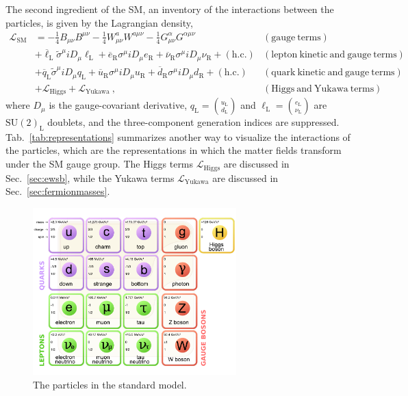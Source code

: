 The second ingredient of the SM, an inventory of the interactions between the
particles, is given by the Lagrangian density, 
\begin{align}
\mathcal{L}_{\mathrm{SM}} &= -\frac{1}{4}B_{\mu\nu}B^{\mu\nu} -\frac{1}{4}W^{a}_{\mu\nu}W^{a\mu\nu} - \frac{1}{4}G^{\alpha}_{\mu\nu}G^{\alpha\mu\nu}
  & \mathrm{(gauge~terms)}\nonumber\\
& +\overline\ell_\mathrm{L}\tilde\sigma^{\mu}iD_{\mu}\ell_\mathrm{L} +
   \overline e_\mathrm{R}\sigma^{\mu}iD_{\mu}e_\mathrm{R} + \overline \nu_\mathrm{R}
   \sigma^{\mu}iD_{\mu}\nu_\mathrm{R} + (\mathrm{h.c.})& \mathrm{(lepton~kinetic~and~gauge~terms)}\nonumber\\
& +\overline q_\mathrm{L}\tilde\sigma^{\mu}iD_{\mu}q_\mathrm{L} +
   \overline u_\mathrm{R}\sigma^{\mu}iD_{\mu}u_\mathrm{R} + \overline d_\mathrm{R}
   \sigma^{\mu}iD_{\mu}d_\mathrm{R} + (\mathrm{h.c.})& \mathrm{(quark~kinetic~and~gauge~terms)}\nonumber\\
& +\mathcal L_{\mathrm{Higgs}} +\mathcal L_{\mathrm{Yukawa}}~, &  \mathrm{(Higgs~and~Yukawa~terms)}
\label{eqn:lsm}
\end{align}
where $D_{\mu}$ is the gauge-covariant derivative, $q_\mathrm{L} =
\binom{u_\mathrm{L}}{d_\mathrm{L}}$ and $\ell_\mathrm{L} = \binom{e_\mathrm{L}}{\nu_\mathrm{L}}$ are
$\mathrm{SU(2)}_{\mathrm{L}}$ doublets, and the three-component
generation indices are suppressed.
Tab.~\ref{tab:representations} summarizes another way to visualize the
interactions of the particles, which are the representations in which the matter fields transform under the SM
gauge group. The Higgs terms $\mathcal L_{\mathrm{Higgs}}$ are discussed in
Sec.~\ref{sec:ewsb}, while the Yukawa terms $\mathcal
L_{\mathrm{Yukawa}}$ are discussed in Sec.~\ref{sec:fermionmasses}.

\begin{figure}
\centering
\includegraphics[width=0.7\textwidth]{figs/theory/standardmodel.pdf}
\caption{\label{fig:standardmodel} The particles in the standard model.}
\end{figure}

